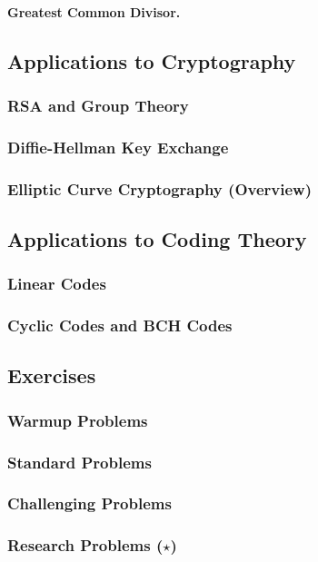 \paragraph{Greatest Common Divisor.}

\subsection{Applications to Cryptography}
\label{subsec:crypto-algebra}

\subsubsection{RSA and Group Theory}
\subsubsection{Diffie-Hellman Key Exchange}
\subsubsection{Elliptic Curve Cryptography (Overview)}

\subsection{Applications to Coding Theory}
\label{subsec:coding-algebra}

\subsubsection{Linear Codes}
\subsubsection{Cyclic Codes and BCH Codes}

\subsection{Exercises}
\subsubsection{Warmup Problems}
\subsubsection{Standard Problems}
\subsubsection{Challenging Problems}
\subsubsection{Research Problems ($\star$)}